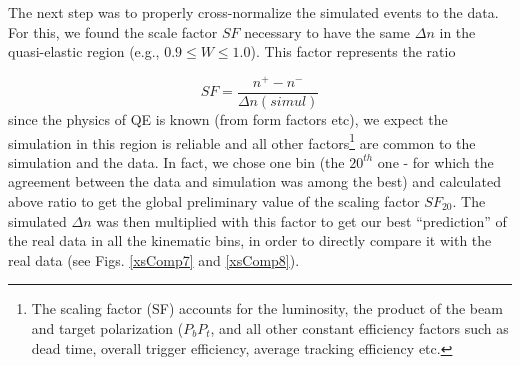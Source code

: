 The next step was to properly cross-normalize the simulated events to the data. %
For this, we %
found the scale factor $SF$ necessary to have the same $\Delta n$ in the quasi-elastic region (e.g., $0.9 \le W \le 1.0$). This factor represents the ratio

\begin{equation}
 SF = \frac{n^+ - n^-}{\Delta n(simul)} %
\end{equation}
since the physics of QE is known (from form factors etc), we expect the simulation in this region is reliable %
 and all other factors\footnote{The scaling factor (SF) accounts for the luminosity, the product of the beam and target polarization ($P_bP_t$, and all other constant efficiency factors such as dead time, overall trigger efficiency, average tracking efficiency etc.} are common to the simulation and the data.
 In fact, we chose one \qsqs bin (the $20^{th}$ one - for which the agreement between the data and simulation was among the best) and calculated above ratio to get the global preliminary value of the scaling factor $SF_{20}$. The simulated $\Delta n$ was then multiplied with this factor to get our best ``prediction'' of the real data in all the kinematic bins, in order to directly compare it with the real data (see Figs. \ref{xsComp7} and \ref{xsComp8}). 




